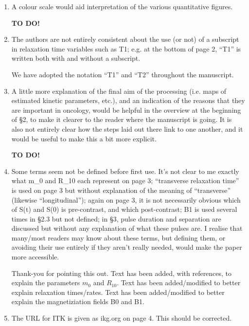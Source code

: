 \documentclass[11pt]{article}
\begin{document}
\begin{enumerate}

\item A colour scale would aid interpretation of the various
  quantitative figures.

  \textbf{TO DO!}

\item The authors are not entirely consistent about the use (or not)
  of a subscript in relaxation time variables such as T1; e.g. at the
  bottom of page 2, ``T1'' is written both with and without a
  subscript.

  We have adopted the notation ``T1'' and ``T2'' throughout the
  manuscript.

\item A little more explanation of the final aim of the processing
  (i.e.  maps of estimated kinetic parameters, etc.), and an
  indication of the reasons that they are important in oncology, would
  be helpful in the overview at the beginning of \S2, to make it
  clearer to the reader where the manuscript is going.  It is also not
  entirely clear how the steps laid out there link to one another, and
  it would be useful to make this a bit more explicit.

  \textbf{TO DO!}

\item Some terms seem not be defined before first use.  It's not clear
  to me exactly what m\_0 and R\_10 each represent on page 3;
  ``transverse relaxation time'' is used on page 3 but without
  explanation of the meaning of ``transverse'' (likewise
  ``longitudinal''); again on page 3, it is not necessarily obvious
  which of S(t) and S(0) is pre-contrast, and which post-contrast; B1
  is used several times in \S2.3 but not defined; in \S3, pulse
  duration and separation are discussed but without any explanation of
  what these pulses are. I realise that many/most readers may know
  about these terms, but defining them, or avoiding their use entirely
  if they aren't really needed, would make the paper more accessible.

  Thank-you for pointing this out.  Text has been added, with
  references, to explain the parameters $m_0$ and $R_{10}$.  Text has
  been added/modified to better explain relaxation times/rates.  Text
  has been added/modified to better explain the magnetiziation fields
  B0 and B1.

\item The URL for ITK is given as ikg.org on page 4. This should be
  corrected.


\end{enumerate}
\end{document}
